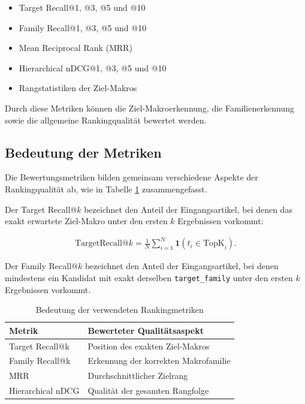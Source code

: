 \begin{itemize} 
  \item Target Recall@1, @3, @5 und @10 
  \item Family Recall@1, @3, @5 und @10 
  \item Mean Reciprocal Rank (MRR) 
  \item Hierarchical nDCG@1, @3, @5 und @10 
  \item Rangstatistiken der Ziel-Makros \parencite{EPLAN-Makros} 
\end{itemize} 

Durch diese Metriken können die Ziel-Makroerkennung, die Familienerkennung sowie die allgemeine Rankingqualität bewertet werden.

\subsection{Bedeutung der Metriken} 

Die Bewertungsmetriken bilden gemeinsam verschiedene Aspekte der Rankingqualität ab, wie in Tabelle \ref{tab:rankingmetriken_bedeutung} zusammengefasst.

Der Target Recall@$k$ bezeichnet den Anteil der Eingangsartikel, bei denen das exakt erwartete Ziel-Makro unter den ersten $k$ Ergebnissen vorkommt:

\begin{align}
  \mathrm{TargetRecall@}k = \frac{1}{N} \sum_{i=1}^{N} \mathbf{1}(t_i \in \mathrm{TopK}_i).
\end{align}

Der Family Recall@$k$ bezeichnet den Anteil der Eingangsartikel, bei denen mindestens ein Kandidat mit exakt derselben \texttt{target\_family} unter den ersten $k$ Ergebnissen vorkommt. 

\begin{table}[H]
  \centering
  \setlength{\tabcolsep}{6pt}
  \renewcommand{\arraystretch}{1.1}
  \caption{Bedeutung der verwendeten Rankingmetriken}
  \label{tab:rankingmetriken_bedeutung}
  \begin{tabularx}{\textwidth}{>{\raggedright\arraybackslash}p{4cm} >{\raggedright\arraybackslash}X}
    \toprule
    \textbf{Metrik} & \textbf{Bewerteter Qualitätsaspekt} \\
    \midrule
    Target Recall@k & Position des exakten Ziel-Makros \parencite{EPLAN-Makros} \\
    Family Recall@k & Erkennung der korrekten Makrofamilie \\
    MRR & Durchschnittlicher Zielrang \\
    Hierarchical nDCG & Qualität der gesamten Rangfolge \\
    \bottomrule
  \end{tabularx}
\end{table}

